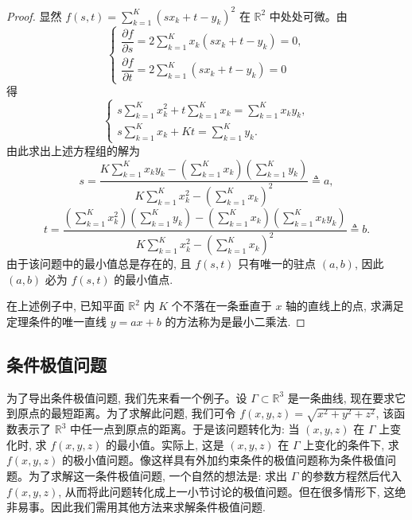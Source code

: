 \begin{proof}
显然 $f(s,t)=\sum\limits_{k=1}^K(sx_k+t-y_k)^2$ 在 $\mathbb R^2$ 中处处可微。由
\[
  \begin{cases}
    \dfrac{\partial f}{\partial s}
    =2\displaystyle\sum_{k=1}^K x_k(sx_k+t-y_k)=0,\\[1.2ex]
    \dfrac{\partial f}{\partial t}
    =2\displaystyle\sum_{k=1}^K (sx_k+t-y_k)=0
  \end{cases}
\]
得
\[
  \begin{cases}
    s\displaystyle\sum_{k=1}^K x_k^2
    +t\displaystyle\sum_{k=1}^K x_k
    =\displaystyle\sum_{k=1}^K x_ky_k,\\[1.2ex]
    s\displaystyle\sum_{k=1}^K x_k
    +Kt
    =\displaystyle\sum_{k=1}^K y_k.
  \end{cases}
\]
由此求出上述方程组的解为
\[
  s=
  \frac{
    K\displaystyle\sum_{k=1}^K x_ky_k
    -\left(\displaystyle\sum_{k=1}^K x_k\right)
     \left(\displaystyle\sum_{k=1}^K y_k\right)}
  {
    K\displaystyle\sum_{k=1}^K x_k^2
    -\left(\displaystyle\sum_{k=1}^K x_k\right)^2}
  \triangleq a,
\]
\[
  t=
  \frac{
    \left(\displaystyle\sum_{k=1}^K x_k^2\right)
    \left(\displaystyle\sum_{k=1}^K y_k\right)
    -\left(\displaystyle\sum_{k=1}^K x_k\right)
     \left(\displaystyle\sum_{k=1}^K x_ky_k\right)}
  {
    K\displaystyle\sum_{k=1}^K x_k^2
    -\left(\displaystyle\sum_{k=1}^K x_k\right)^2}
  \triangleq b.
\]
由于该问题中的最小值总是存在的, 且 $f(s,t)$ 只有唯一的驻点 $(a,b)$, 因此 $(a,b)$ 必为 $f(s,t)$ 的最小值点.

在上述例子中, 已知平面 $\mathbb R^2$ 内 $K$ 个不落在一条垂直于 $x$ 轴的直线上的点, 求满足定理条件的唯一直线 $y=ax+b$ 的方法称为是最小二乘法.
\end{proof}


\subsection{条件极值问题}
\label{subsec:ma-14-5-2}

为了导出条件极值问题, 我们先来看一个例子。设 $\Gamma\subset\mathbb R^3$ 是一条曲线, 现在要求它到原点的最短距离。为了求解此问题, 我们可令 $f(x,y,z)=\sqrt{x^2+y^2+z^2}$, 该函数表示了 $\mathbb R^3$ 中任一点到原点的距离。于是该问题转化为: 当 $(x,y,z)$ 在 $\Gamma$ 上变化时, 求 $f(x,y,z)$ 的最小值。实际上, 这是 $(x,y,z)$ 在 $\Gamma$ 上变化的条件下, 求 $f(x,y,z)$ 的极小值问题。像这样具有外加约束条件的极值问题称为条件极值问题。为了求解这一条件极值问题, 一个自然的想法是: 求出 $\Gamma$ 的参数方程然后代入 $f(x,y,z)$, 从而将此问题转化成上一小节讨论的极值问题。但在很多情形下, 这绝非易事。因此我们需用其他方法来求解条件极值问题.

